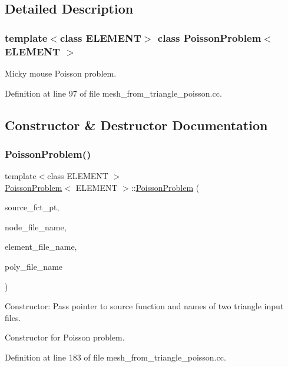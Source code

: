 \subsection{Detailed Description}
\subsubsection*{template$<$class E\+L\+E\+M\+E\+NT$>$\newline
class Poisson\+Problem$<$ E\+L\+E\+M\+E\+N\+T $>$}

Micky mouse Poisson problem. 

Definition at line 97 of file mesh\+\_\+from\+\_\+triangle\+\_\+poisson.\+cc.



\subsection{Constructor \& Destructor Documentation}
\mbox{\label{classPoissonProblem_a80765a4c029f9659b631a80c583b58cc}} 
\subsubsection{\texorpdfstring{Poisson\+Problem()}{PoissonProblem()}}
{\footnotesize\ttfamily template$<$class E\+L\+E\+M\+E\+NT $>$ \\
\hyperlink{classPoissonProblem}{Poisson\+Problem}$<$ E\+L\+E\+M\+E\+NT $>$\+::\hyperlink{classPoissonProblem}{Poisson\+Problem} (\begin{DoxyParamCaption}\item[{Poisson\+Equations$<$ 2 $>$\+::Poisson\+Source\+Fct\+Pt}]{source\+\_\+fct\+\_\+pt,  }\item[{const string \&}]{node\+\_\+file\+\_\+name,  }\item[{const string \&}]{element\+\_\+file\+\_\+name,  }\item[{const string \&}]{poly\+\_\+file\+\_\+name }\end{DoxyParamCaption})}



Constructor\+: Pass pointer to source function and names of two triangle input files. 

Constructor for Poisson problem. 

Definition at line 183 of file mesh\+\_\+from\+\_\+triangle\+\_\+poisson.\+cc.



